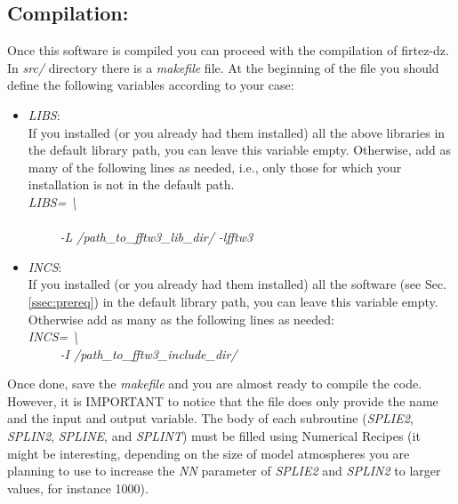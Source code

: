 \subsection{Compilation:}
Once this software is compiled you can proceed with the compilation of firtez-dz. In {\it src/} directory there is a {\it makefile} file. At the beginning of the file you should define the following variables according to your case:\\
\begin{itemize}
  \item {\it LIBS}:\\
  If you installed (or you already had them installed) all the above libraries in the default library path, you can leave this variable empty. Otherwise, add as many of the following lines as needed, i.e., only those for which your installation is not in the default path.\\
  {\it LIBS= \textbackslash}\\
  \hspace{10mm}{\it -L /path\_to\_lapack\_lib\_dir/ -llapack -lblas \textbackslash}\\
  {\it \ \ \ \ \ -L /path\_to\_fftw3\_lib\_dir/ -lfftw3}\\
  \item {\it INCS}:\\
  If you installed (or you already had them installed) all the software (see Sec. \ref{ssec:prereq}) in the default library path, you can leave this variable empty. Otherwise add as many as the following lines as needed:\\
  {\it INCS= \textbackslash}\\
  {\it \ \ \ \ \ -I /path\_to\_fftw3\_include\_dir/}\\
\end{itemize}
%
Once done, save the {\it makefile} and you are almost ready to compile the code.\\

However, it is IMPORTANT to notice that the file {\it } does only provide the name and the input and output variable. The body of each subroutine ({\it SPLIE2}, {\it SPLIN2}, {\it SPLINE}, and {\it SPLINT}) must be filled using Numerical Recipes (it might be interesting, depending on the size of model atmospheres you are planning to use to increase the {\it NN} parameter of {\it SPLIE2} and {\it SPLIN2} to larger values, for instance 1000).\\

